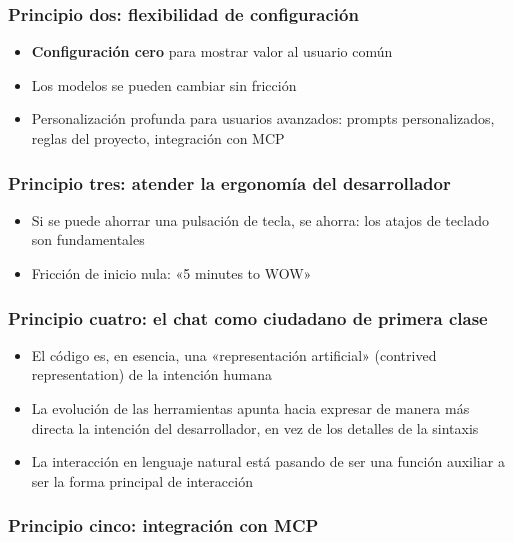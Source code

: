 \subsubsection{Principio dos: flexibilidad de configuración}

\begin{itemize}
    \item \textbf{Configuración cero} para mostrar valor al usuario común
    \item Los modelos se pueden cambiar sin fricción
    \item Personalización profunda para usuarios avanzados: prompts personalizados, reglas del proyecto, integración con MCP
\end{itemize}

\subsubsection{Principio tres: atender la ergonomía del desarrollador}

\begin{itemize}
    \item Si se puede ahorrar una pulsación de tecla, se ahorra: los atajos de teclado son fundamentales
    \item Fricción de inicio nula: «5 minutes to WOW»
\end{itemize}

\subsubsection{Principio cuatro: el chat como ciudadano de primera clase}

\begin{itemize}
    \item El código es, en esencia, una «representación artificial» (contrived representation) de la intención humana
    \item La evolución de las herramientas apunta hacia expresar de manera más directa la intención del desarrollador, en vez de los detalles de la sintaxis
    \item La interacción en lenguaje natural está pasando de ser una función auxiliar a ser la forma principal de interacción
\end{itemize}

\subsubsection{Principio cinco: integración con MCP}

